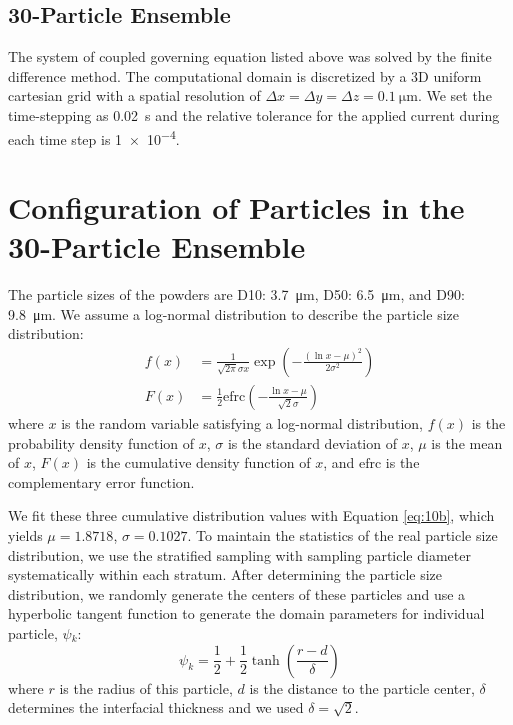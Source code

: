 \documentclass{article}
\begin{document}
\subsection{30-Particle Ensemble}

The system of coupled governing equation listed above was solved by
the finite difference method. The computational domain is discretized
by a 3D uniform cartesian grid with a spatial resolution of $\Delta
x=\Delta y=\Delta z= \SI{0.1}{\micro\meter}$. We set the time-stepping
as \SI{0.02}{\second} and the relative tolerance for the applied
current during each time step is \num{1e-4}.


\section{Configuration of Particles in the 30-Particle Ensemble}

The particle sizes of the \nca{} powders are D10:
\SI{3.7}{\micro\meter}, D50: \SI{6.5}{\micro\meter}, and D90:
\SI{9.8}{\micro\meter}. We assume a log-normal distribution to
describe the particle size distribution:
\begin{subequations}
\begin{align}
  f(x) & = \frac {1}{\sqrt{2\pi}\sigma x} \exp \left(-\frac{(\ln{x}-\mu )^2}{2\sigma^2}\right)
  \label{eq:10a} \\
  F(x) &= \frac{1}{2} \mathrm{efrc}\left(-\frac{\ln{x}-\mu }{\sqrt{2}\sigma}\right)
  \label{eq:10b}
\end{align}
\end{subequations}
where $x$ is the random variable satisfying a log-normal distribution,
$f(x)$ is the probability density function of $x$, $\sigma$ is the
standard deviation of $x$, $\mu$ is the mean of $x$, $F(x)$ is the
cumulative density function of $x$, and $\mathrm{efrc}$ is the
complementary error function.

We fit these three cumulative distribution values with Equation
\ref{eq:10b}, which yields $\mu =1.8718$, $\sigma=0.1027$. To maintain
the statistics of the real particle size distribution, we use the
stratified sampling\cite{parsons2017} with sampling particle diameter
systematically within each stratum. After determining the particle
size distribution, we randomly generate the centers of these particles
and use a hyperbolic tangent function to generate the domain
parameters for individual particle, $\psi{}_k$:
\begin{equation}
  \psi_k=\frac{1}{2}+\frac{1}{2}\tanh\left(\frac{r-d}{\delta}\right)
  \label{eq:11}
\end{equation}
where $r$ is the radius of this particle, $d$ is the distance to the
particle center, $\delta$ determines the interfacial thickness and we
used $\delta = \sqrt{2}$.
\end{document}
